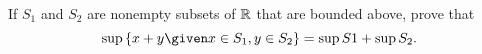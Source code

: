 \begin{problem}
  If $S_1$ and $S_2$ are nonempty subsets of $\mathbb{R}$ that are bounded above,
  prove that \[ \sup \set{x + y \given x \in S_1, y \in S_2} = \sup S1 + \sup S_2. \]
\end{problem}

\begin{answer}

\end{answer}
